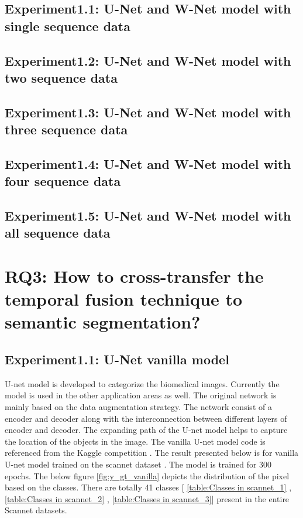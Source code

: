     \subsection{Experiment1.1: U-Net and W-Net model with single sequence data}
    \subsection{Experiment1.2: U-Net and W-Net model with two sequence data}
    \subsection{Experiment1.3: U-Net and W-Net model with three sequence data}
    \subsection{Experiment1.4: U-Net and W-Net model with four sequence data}
    \subsection{Experiment1.5: U-Net and W-Net model with all sequence data}
    \section{RQ3: How to cross-transfer the temporal fusion technique to semantic segmentation?}
    \subsection{Experiment1.1: U-Net vanilla model}
    
    U-net model is developed to categorize the biomedical images. Currently the model is used in the other application areas as well. The original network is mainly based on the data augmentation strategy. The network consist of a encoder and decoder along with the interconnection between different layers of encoder and decoder. The expanding path of the U-net model helps to capture the location of the objects in the image. The vanilla U-net model code is referenced from the Kaggle competition \cite{85_kag_challenge}. The result presented below is for vanilla U-net model trained on the scannet dataset \cite{79_dai2017scannet}. The model is trained for 300 epochs. The below figure \ref{fig:y_gt_vanilla} depicts the distribution of the pixel based on the classes. There are totally 41 classes [ \ref{table:Classes in scannet_1} , \ref{table:Classes in scannet_2} , \ref{table:Classes in scannet_3}] present in the entire Scannet datasets.        
    
